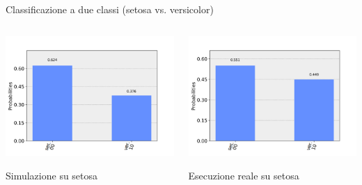 \documentclass{beamer}
\begin{document}
    \begin{frame}{Classificazione a due classi (setosa vs. versicolor)}
        \begin{columns}
            \begin{center}
                \includegraphics[width=\textwidth]{gfx/misura_setosa_filtrata_20191015_1145.png}
                
                Simulazione su setosa
            \end{center}
            \begin{center}
                \includegraphics[width=\textwidth]{gfx/misura_setosa_sperimentale.png}

                Esecuzione reale su setosa
            \end{center}
        \end{columns}
    \end{frame}
\end{document}
